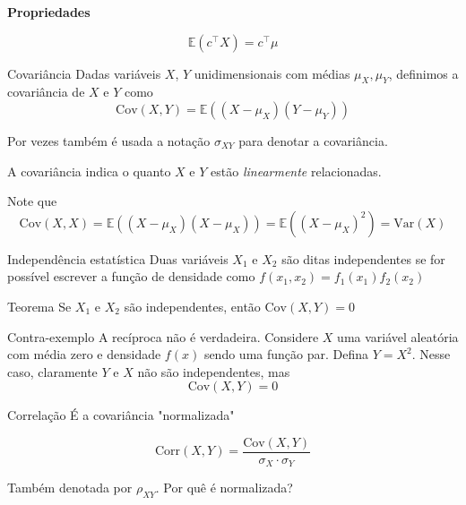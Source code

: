 \documentclass[
  ignorenonframetext,
  aspectratio=169,
]{beamer}
\newcommand{\EE}{\mathbb{E}}
\begin{document}
\begin{frame}
\textbf{Propriedades}

\[\EE(c^\top X) = c^\top\mu\]
\end{frame}

\begin{frame}{Covariância}
Dadas variáveis \(X\), \(Y\) unidimensionais com médias
\(\mu_X, \mu_Y\), definimos a covariância de \(X\) e \(Y\) como
\[\text{Cov}(X,Y) = \EE( (X - \mu_X)(Y - \mu_Y))\]

Por vezes também é usada a notação \(\sigma_{XY}\) para denotar a
covariância.

A covariância indica o quanto \(X\) e \(Y\) estão \emph{linearmente}
relacionadas.
\end{frame}

\begin{frame}
Note que
\[\text{Cov}(X,X) = \EE( (X - \mu_X)(X - \mu_X)) =  \EE((X-\mu_X)^2) =  \text{Var}(X)\]
\end{frame}

\begin{frame}{Independência estatística}
Duas variáveis \(X_1\) e \(X_2\) são ditas independentes se for possível
escrever a função de densidade como \(f(x_1,x_2) = f_1(x_1)f_2(x_2)\)

\begin{block}{Teorema}
Se \(X_1\) e \(X_2\) são independentes, então \(\text{Cov}(X,Y)=0\)
\end{block}
\end{frame}

\begin{frame}
\begin{block}{Contra-exemplo}
A recíproca não é verdadeira. Considere \(X\) uma variável aleatória com
média zero e densidade \(f(x)\) sendo uma função par. Defina
\(Y = X^2\). Nesse caso, claramente \(Y\) e \(X\) não são independentes,
mas \[\text{Cov}(X,Y) = 0 \]
\end{block}
\end{frame}

\begin{frame}{Correlação}
É a covariância "normalizada"

\[\text{Corr}(X,Y) = \frac{\text{Cov}(X,Y)}{\sigma_X\cdot\sigma_Y}\]

Também denotada por \(\rho_{XY}\). Por quê é normalizada?
\end{frame}
\end{document}
